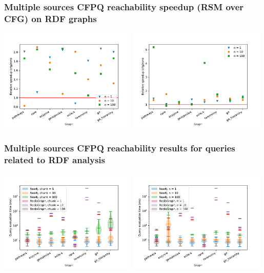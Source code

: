 \documentclass[xcolor=table,aspectratio=169]{beamer}
\begin{document}
\begin{frame}[fragile] \frametitle{Multiple sources CFPQ reachability speedup (RSM over CFG) on RDF graphs}  
  \begin{center}        
    \includegraphics[width=0.49\textwidth]{pictures/g1_kotgll_result.pdf}
    \includegraphics[width=0.49\textwidth]{pictures/geo_kotgll_result.pdf}
  \end{center}
\end{frame}


\begin{frame}[fragile] \frametitle{Multiple sources CFPQ reachability results for queries related to RDF analysis}
  \begin{center}        
    \includegraphics[width=0.49\textwidth]{pictures/g1_result.pdf}
    \includegraphics[width=0.49\textwidth]{pictures/geo_result.pdf}
  \end{center}
\end{frame}
\end{document}
